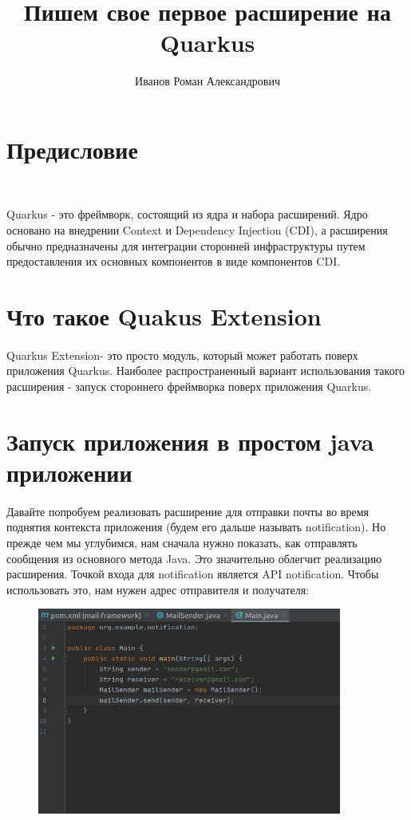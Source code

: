 \documentclass[russian,11pt]{article}
\begin{document}
\title{Пишем свое первое расширение на Quarkus}
\author{Иванов Роман Александрович}

\maketitle

\newpage
\tableofcontents
\newpage

\section{Предисловие}
~

 Quarkus - это фреймворк, состоящий из ядра и набора расширений. Ядро основано на внедрении Context и Dependency Injection (CDI), а расширения обычно предназначены для интеграции сторонней инфраструктуры путем предоставления их основных компонентов в виде компонентов CDI.

\section{Что такое Quakus Extension}
\paragraph{	} Quarkus Extension- это просто модуль, который может работать поверх приложения Quarkus. Наиболее распространенный вариант использования такого расширения - запуск стороннего фреймворка поверх приложения Quarkus.

\section{Запуск приложения в простом java приложении}
\paragraph{ } 
Давайте попробуем реализовать расширение для отправки почты во время поднятия контекста приложения (будем его дальше называть notification). Но прежде чем мы углубимся, нам сначала нужно показать, как отправлять сообщения из основного метода Java. Это значительно облегчит реализацию расширения. Точкой входа для notification является API notification. Чтобы использовать это, нам нужен адрес отправителя и получателя:

\begin{figure}[H]
	\centering
	\includegraphics[scale=1.5, width=10cm]{1}
\end{figure}
~
\end{document}
